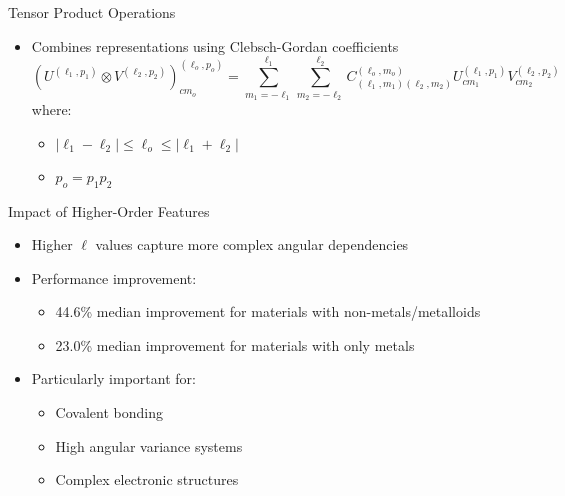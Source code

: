 \begin{frame}{Tensor Product Operations}
    \begin{itemize}
        \item Combines representations using Clebsch-Gordan coefficients
        \[
        (U^{(\ell_1,p_1)} \otimes V^{(\ell_2,p_2)})^{(\ell_o,p_o)}_{cm_o} = 
        \sum_{m_1=-\ell_1}^{\ell_1} \sum_{m_2=-\ell_2}^{\ell_2} 
        C^{(\ell_o,m_o)}_{(\ell_1,m_1)(\ell_2,m_2)} 
        U^{(\ell_1,p_1)}_{cm_1} V^{(\ell_2,p_2)}_{cm_2}
        \]
        where:
        \begin{itemize}
            \item $|\ell_1 - \ell_2| \leq \ell_o \leq |\ell_1 + \ell_2|$
            \item $p_o = p_1p_2$
        \end{itemize}
    \end{itemize}
\end{frame}

\begin{frame}{Impact of Higher-Order Features}
    \begin{itemize}
        \item Higher $\ell$ values capture more complex angular dependencies
        \item Performance improvement:
        \begin{itemize}
            \item 44.6\% median improvement for materials with non-metals/metalloids
            \item 23.0\% median improvement for materials with only metals
        \end{itemize}
        \item Particularly important for:
        \begin{itemize}
            \item Covalent bonding
            \item High angular variance systems
            \item Complex electronic structures
        \end{itemize}
    \end{itemize}
\end{frame} 